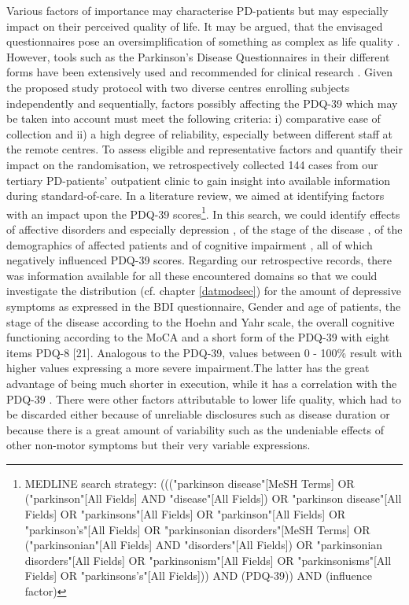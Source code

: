 \documentclass[number,12pt,review]{elsarticle}
\begin{document}
Various factors of importance may characterise \ac{PD}-patients but may especially impact on their perceived quality of life. It may be argued, that the envisaged questionnaires pose an oversimplification of something as complex as life quality \citep{martinez1998introduction}. However, tools such as the Parkinson's Disease Questionnaires in their different forms have been extensively used and recommended for clinical research \citep{marinus2002health}. Given the proposed study protocol with two diverse centres enrolling subjects independently and sequentially, factors possibly affecting the \ac{PDQ-39} which may be taken into account must meet the following criteria: i) comparative ease of collection and ii) a high degree of reliability, especially between different staff at the remote centres. To assess eligible and representative factors and quantify their impact on the randomisation, we retrospectively collected 144 cases from our tertiary \ac{PD}-patients' outpatient clinic to gain insight into available information during standard-of-care. 
In a literature review, we aimed at identifying factors with an impact upon the \ac{PDQ-39} scores\footnote{MEDLINE search strategy: ((("parkinson disease"[MeSH Terms] OR ("parkinson"[All Fields] AND "disease"[All Fields]) OR "parkinson disease"[All Fields] OR "parkinsons"[All Fields] OR "parkinson"[All Fields] OR "parkinson's"[All Fields] OR "parkinsonian disorders"[MeSH Terms] OR ("parkinsonian"[All Fields] AND "disorders"[All Fields]) OR "parkinsonian disorders"[All Fields] OR "parkinsonism"[All Fields] OR "parkinsonisms"[All Fields] OR "parkinsons's"[All Fields])) AND (PDQ-39)) AND (influence factor)}. 
In this search, we could identify effects of affective disorders and especially depression \citep{Rosinczuk2017-rn, Wiesli2017-eq, schrag2000contributes, zipprich2021self}, of the stage of the disease \citep{benge2016duration, martinez1997assessing, Wu2014-pk}, of the demographics of affected patients \citep{Wu2014-pk, cubo2002importance} and of cognitive impairment \citep{schrag2000contributes, Wiesli2017-eq}, all of which negatively influenced \ac{PDQ-39} scores. Regarding our retrospective records, there was information available for all these encountered domains so that we could investigate the distribution (cf. chapter \ref{datmodsec}) for the amount of depressive symptoms as expressed in the \ac{BDI} questionnaire, Gender and age of patients, the stage of the disease according to the Hoehn and Yahr scale, the overall cognitive functioning according to the \ac{MoCA}\citep{nasreddine2005montreal} and a short form of the \ac{PDQ-39} with eight items \acs{PDQ-8} [21]. Analogous to the \ac{PDQ-39}, values between 0 - 100\% result with higher values expressing a more severe impairment.The latter has the great advantage of being much shorter in execution, while it has a correlation with the PDQ-39 \citep{chen2017evaluation}. There were other factors attributable to lower life quality, which had to be discarded either because of unreliable disclosures such as disease duration \citep{Benge2016-wp} or because there is a great amount of variability such as the undeniable effects of other non-motor symptoms \citep{Wu2014-pk, Zipprich2021-vv} but their very variable expressions.
\end{document}
